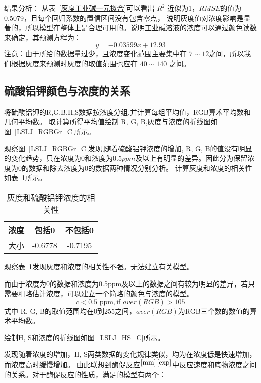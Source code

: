     结果分析： 从表~\ref{灰度工业碱一元拟合}可以看出 $R^2$ 近似为1，$RMSE$的值为0.5079，且每个回归系数的置信区间没有包含零点，
    说明灰度值对浓度影响是显著的，所以模型在整体上是合理可用的。说明工业碱溶液的浓度可以通过颜色读数来确定，其预测方程为：
        $$y = -0.03599 x + 12.93 $$
    注意：由于所给的数据量过少，且浓度变化范围主要集中在 $7 \sim 12$之间，所以我们根据灰度来预测时灰度的取值范围也应在 $40 \sim 140$
    之间。
\subsection{硫酸铝钾颜色与浓度的关系}

    将硫酸铝钾的R,G,B,H,S数据按浓度分组,并计算每组平均值，RGB算术平均数和几何平均数。
    取计算所得平均值绘制 R, G, B,灰度与浓度的折线图如图~\ref{LSLJ_RGBGr_C}所示。

    
    观察图~\ref{LSLJ_RGBGr_C}发现,随着硫酸铝钾浓度的增加, R, G, B的值没有明显的变化趋势，只在浓度为0和浓度为0.5$ppm$及以上有明显的差异。因此分为保留浓度为0的数据和除去浓度为0的数据两种情况分别分析。
    计算灰度和浓度的相关性如表~\ref{硫酸铝钾浓度和灰度}所示。
    \begin{table}[H]
      \centering
      \caption{灰度和硫酸铝钾浓度的相关性}
      \label{硫酸铝钾浓度和灰度}
      \begin{tabular}{@{}ccc@{}}
      \toprule
      浓度 & 包括0     & 不包括0    \\ \midrule
      大小 & -0.6778 & -0.7195 \\ \bottomrule
      \end{tabular}
    \end{table}
    
    观察表~\ref{硫酸铝钾浓度和灰度}发现灰度和浓度的相关性不强。无法建立有关模型。
    
    而由于浓度为0的数据和浓度为0.5ppm及以上的数据之间有较为明显的差异，若只需要粗略估计浓度，可以建立一个简略的颜色与浓度的模型。
    $$ c<0.5 \text{ ppm}, \text{if } aver(RGB)>105 $$
    式中 R, G, B的取值范围均在0到255之间，$aver(RGB)$为RGB三个数的数值的算术平均数。
    
    绘制H, S和浓度的折线图如图~\ref{LSLJ_HS_C}所示。

    
    发现随着浓度的增加，H, S两类数据的变化规律类似，均为在浓度低是快速增加，而浓度高时缓慢增加。
    由此联想到酶促反应$^{\cite{mm}}$$^{\cite{exp}}$中反应速度和底物浓度之间的关系。对于酶促反应的性质，满足的模型有两个：
    

